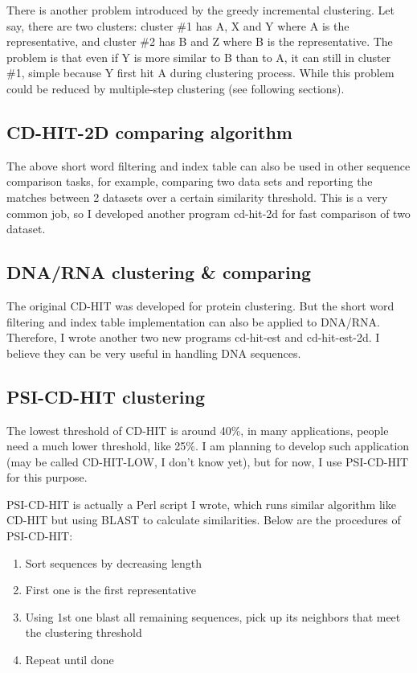 \documentclass[12pt,a4paper]{article}
\begin{document}
There is another problem introduced by the greedy incremental clustering. Let say, there are two clusters: cluster \#1 has A, X and Y where A is the representative, and cluster \#2 has B and Z where B is the representative. The problem is that even if Y is more similar to B than to A, it can still in cluster \#1, simple because Y first hit A during clustering process. While this problem could be reduced by multiple-step clustering (see following sections).

\subsection{CD-HIT-2D comparing algorithm }

The above short word filtering and index table can also be used in other sequence comparison tasks, for example, comparing two data sets and reporting the matches between 2 datasets over a certain similarity threshold. This is a very common job, so I developed another program cd-hit-2d for fast comparison of two dataset.

\subsection{DNA/RNA clustering \& comparing }

The original CD-HIT was developed for protein clustering. But the short word filtering and index table implementation can also be applied to DNA/RNA. Therefore, I wrote another two new programs cd-hit-est and cd-hit-est-2d. I believe they can be very useful in handling DNA sequences.

\subsection{PSI-CD-HIT clustering }

The lowest threshold of CD-HIT is around 40\%, in many applications, people need a much lower threshold, like 25\%. I am planning to develop such application (may be called CD-HIT-LOW, I don't know yet), but for now, I use PSI-CD-HIT for this purpose.

PSI-CD-HIT is actually a Perl script I wrote, which runs similar algorithm like CD-HIT but using BLAST to calculate similarities. Below are the procedures of PSI-CD-HIT:

\begin{enumerate}
 \item  Sort sequences by decreasing length 

\item  First one is the first representative

\item  Using 1st one blast all remaining sequences, pick up its neighbors that meet the clustering threshold

\item  Repeat until done

\end{enumerate}
\end{document}
